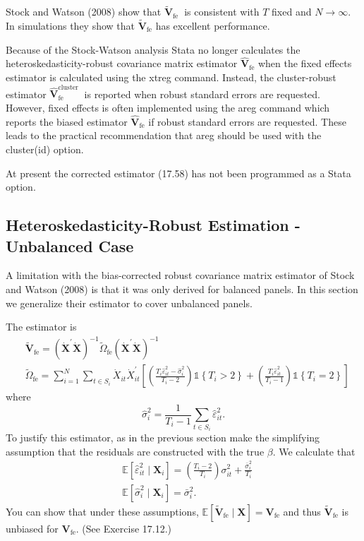 \documentclass[10pt]{article}
\begin{document}
Stock and Watson (2008) show that $\widetilde{\boldsymbol{V}}_{\text {fe }}$ is consistent with $T$ fixed and $N \rightarrow \infty$. In simulations they show that $\widetilde{\boldsymbol{V}}_{\mathrm{fe}}$ has excellent performance.

Because of the Stock-Watson analysis Stata no longer calculates the heteroskedasticity-robust covariance matrix estimator $\widehat{\boldsymbol{V}}_{\mathrm{fe}}$ when the fixed effects estimator is calculated using the xtreg command. Instead, the cluster-robust estimator $\widehat{\boldsymbol{V}}_{\mathrm{fe}}^{\text {cluster }}$ is reported when robust standard errors are requested. However, fixed effects is often implemented using the areg command which reports the biased estimator $\widehat{\boldsymbol{V}}_{\mathrm{fe}}$ if robust standard errors are requested. These leads to the practical recommendation that areg should be used with the cluster(id) option.

At present the corrected estimator (17.58) has not been programmed as a Stata option.

\subsection{Heteroskedasticity-Robust Estimation - Unbalanced Case}
A limitation with the bias-corrected robust covariance matrix estimator of Stock and Watson (2008) is that it was only derived for balanced panels. In this section we generalize their estimator to cover unbalanced panels.

The estimator is
$$
\begin{aligned}
&\widetilde{\boldsymbol{V}}_{\mathrm{fe}}=\left(\dot{\boldsymbol{X}}^{\prime} \dot{\boldsymbol{X}}\right)^{-1} \widetilde{\Omega}_{\mathrm{fe}}\left(\dot{\boldsymbol{X}}^{\prime} \dot{\boldsymbol{X}}\right)^{-1} \\
&\widetilde{\Omega}_{\mathrm{fe}}=\sum_{i=1}^{N} \sum_{t \in S_{i}} \dot{X}_{i t} \dot{X}_{i t}^{\prime}\left[\left(\frac{T_{i} \widehat{\varepsilon}_{i t}^{2}-\widehat{\sigma}_{i}^{2}}{T_{i}-2}\right) \mathbb{1}\left\{T_{i}>2\right\}+\left(\frac{T_{i} \widehat{\varepsilon}_{i t}^{2}}{T_{i}-1}\right) \mathbb{1}\left\{T_{i}=2\right\}\right]
\end{aligned}
$$
where
$$
\widehat{\sigma}_{i}^{2}=\frac{1}{T_{i}-1} \sum_{t \in S_{i}} \widehat{\varepsilon}_{i t}^{2} .
$$
To justify this estimator, as in the previous section make the simplifying assumption that the residuals are constructed with the true $\beta$. We calculate that
$$
\begin{aligned}
&\mathbb{E}\left[\widehat{\varepsilon}_{i t}^{2} \mid \boldsymbol{X}_{i}\right]=\left(\frac{T_{i}-2}{T_{i}}\right) \sigma_{i t}^{2}+\frac{\bar{\sigma}_{i}^{2}}{T_{i}} \\
&\mathbb{E}\left[\widehat{\sigma}_{i}^{2} \mid \boldsymbol{X}_{i}\right]=\bar{\sigma}_{i}^{2} .
\end{aligned}
$$
You can show that under these assumptions, $\mathbb{E}\left[\widetilde{\boldsymbol{V}}_{\mathrm{fe}} \mid \boldsymbol{X}\right]=\boldsymbol{V}_{\mathrm{fe}}$ and thus $\widetilde{\boldsymbol{V}}_{\mathrm{fe}}$ is unbiased for $\boldsymbol{V}_{\mathrm{fe}}$. (See Exercise 17.12.)
\end{document}
